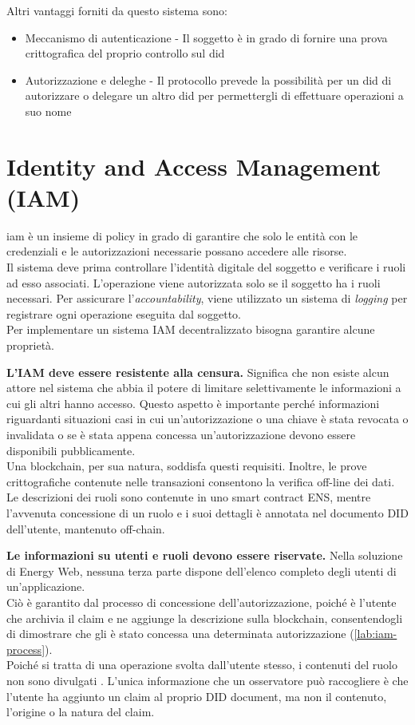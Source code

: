 Altri vantaggi forniti da questo sistema sono:
\begin{itemize}
    \item Meccanismo di autenticazione - Il soggetto è in grado di fornire una prova crittografica del proprio controllo sul \gls{did}
    \item Autorizzazione e deleghe -  Il protocollo prevede la possibilità per un \gls{did} di autorizzare o delegare un altro \gls{did} per permettergli di effettuare operazioni a suo nome
\end{itemize}

\section{Identity and Access Management (IAM)}
\label{sec:iam}

\gls{iam} è un insieme di policy in grado di garantire che solo le entità con le credenziali e le autorizzazioni necessarie possano accedere alle risorse. \\
Il sistema deve prima controllare l'identità digitale del soggetto e verificare i ruoli ad esso associati.
L'operazione viene autorizzata solo se il soggetto ha i ruoli necessari.
Per assicurare l'\textit{accountability}, viene utilizzato un sistema di \textit{logging} per registrare ogni operazione eseguita dal soggetto.\\

Per implementare un sistema IAM decentralizzato bisogna garantire alcune proprietà. 

\textbf{L'IAM deve essere resistente alla censura.}
Significa che non esiste alcun attore nel sistema che abbia il potere di limitare selettivamente le informazioni a cui gli altri hanno accesso.
Questo aspetto è importante perché informazioni riguardanti situazioni casi in cui un'autorizzazione o una chiave è stata revocata o invalidata o se è stata appena concessa un'autorizzazione devono essere disponibili pubblicamente. \\
Una blockchain, per sua natura, soddisfa questi requisiti. Inoltre, le prove crittografiche contenute nelle transazioni consentono la verifica off-line dei dati.
Le descrizioni dei ruoli sono contenute in uno smart contract ENS, mentre l'avvenuta concessione di un ruolo e i suoi dettagli è annotata nel documento DID dell'utente, mantenuto off-chain.

\textbf{Le informazioni su utenti e ruoli devono essere riservate.}
Nella soluzione di Energy Web, nessuna terza parte dispone dell'elenco completo degli utenti di un'applicazione. \\
Ciò è garantito dal processo di concessione dell'autorizzazione, poiché è l'utente che archivia il claim e ne aggiunge la descrizione sulla blockchain, consentendogli di dimostrare che gli è stato concessa una determinata autorizzazione (\autoref{lab:iam-process}). \\
Poiché si tratta di una operazione svolta dall'utente stesso, i contenuti del ruolo non sono divulgati \cite{img:iam}.
L'unica informazione che un osservatore può raccogliere è che l'utente ha aggiunto un claim al proprio DID document, ma non il contenuto, l'origine o la natura del claim. \\

